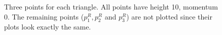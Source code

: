 \begin{figure}[ht]

  \caption{Three points for each triangle. All points have height 10, momentum 0. The remaining points ($p_1^R, p_2^R$ and $p_3^R$) are not plotted since their plots look exactly the same.}
  \label{fig:three-points-equal}
\end{figure}


